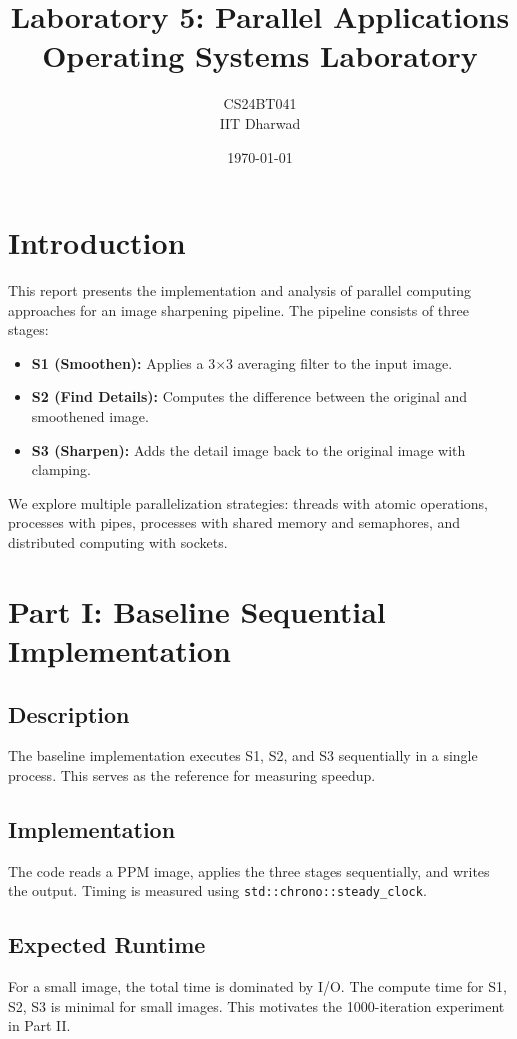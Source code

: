 \documentclass[12pt,a4paper]{article}
\title{\textbf{Laboratory 5: Parallel Applications}\\
\large Operating Systems Laboratory}
\author{CS24BT041 \\ IIT Dharwad}
\date{\today}
\begin{document}
\maketitle
\tableofcontents
\newpage

\section{Introduction}

This report presents the implementation and analysis of parallel computing approaches for an image sharpening pipeline. The pipeline consists of three stages:
\begin{itemize}
    \item \textbf{S1 (Smoothen):} Applies a 3$\times$3 averaging filter to the input image.
    \item \textbf{S2 (Find Details):} Computes the difference between the original and smoothened image.
    \item \textbf{S3 (Sharpen):} Adds the detail image back to the original image with clamping.
\end{itemize}

We explore multiple parallelization strategies: threads with atomic operations, processes with pipes, processes with shared memory and semaphores, and distributed computing with sockets.

\section{Part I: Baseline Sequential Implementation}

\subsection{Description}
The baseline implementation executes S1, S2, and S3 sequentially in a single process. This serves as the reference for measuring speedup.

\subsection{Implementation}
The code reads a PPM image, applies the three stages sequentially, and writes the output. Timing is measured using \texttt{std::chrono::steady\_clock}.

\subsection{Expected Runtime}
For a small image, the total time is dominated by I/O. The compute time for S1, S2, S3 is minimal for small images. This motivates the 1000-iteration experiment in Part II.
\end{document}
